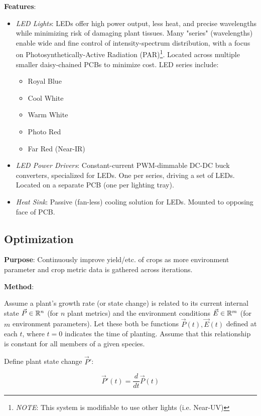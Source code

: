 \documentclass{../tex/report}
\begin{document}
\textbf{Features}:
\begin{itemize}
    \item \textit{LED Lights}: LEDs offer high power output, less heat, and precise wavelengths while minimizing risk of damaging plant tissues. Many "series" (wavelengths) enable wide and fine control of intensity-spectrum distribution, with a focus on Photosynthetically-Active Radiation (PAR)\footnote{\textit{NOTE}: This system is modifiable to use other lights (i.e. Near-UV)}. Located across multiple smaller daisy-chained PCBs to minimize cost. LED series include:
    \begin{itemize}
        \item Royal Blue
        \item Cool White
        \item Warm White
        \item Photo Red
        \item Far Red (Near-IR)
    \end{itemize}
    \item \textit{LED Power Drivers}: Constant-current PWM-dimmable DC-DC buck converters, specialized for LEDs. One per series, driving a set of LEDs. Located on a separate PCB (one per lighting tray).
    \item \textit{Heat Sink}: Passive (fan-less) cooling solution for LEDs. Mounted to opposing face of PCB.
\end{itemize}

\newpage

\subsection{Optimization}
\label{sec:optimization}

\textbf{Purpose}: Continuously improve yield/etc. of crops as more environment parameter and crop metric data is gathered across iterations.

\textbf{Method}: 

Assume a plant's growth rate (or state change) is related to its current internal state $\vec P \in \mathbb R^n$ (for $n$ plant metrics) and the environment conditions $\vec E \in \mathbb R^m$ (for $m$ environment parameters). Let these both be functions $\vec P (t),\vec E(t)$ defined at each $t$, where $t=0$ indicates the time of planting. Assume that this relationship is constant for all members of a given species.

Define plant state change $\vec P'$: 

$$\vec P'(t) = \frac{d}{dt}\vec P(t)$$
\end{document}
